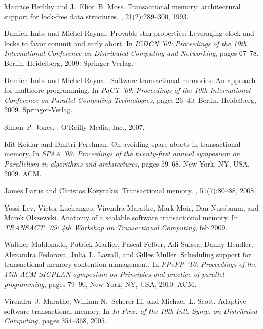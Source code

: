 \begin{thebibliography}{99}
{
Maurice Herlihy and J.~Eliot~B. Moss.
\newblock Transactional memory: architectural support for lock-free data
  structures.
, 21(2):289--300, 1993.

Damien Imbs and Michel Raynal.
\newblock Provable stm properties: Leveraging clock and locks to favor commit
  and early abort.
\newblock In {\em ICDCN '09: Proceedings of the 10th International Conference
  on Distributed Computing and Networking}, pages 67--78, Berlin, Heidelberg,
  2009. Springer-Verlag.

Damien Imbs and Michel Raynal.
\newblock Software transactional memories: An approach for multicore
  programming.
\newblock In {\em PaCT '09: Proceedings of the 10th International Conference on
  Parallel Computing Technologies}, pages 26--40, Berlin, Heidelberg, 2009.
  Springer-Verlag.

Simon~P. Jones.
.
\newblock O'Reilly Media, Inc., 2007.

Idit Keidar and Dmitri Perelman.
\newblock On avoiding spare aborts in transactional memory.
\newblock In {\em SPAA '09: Proceedings of the twenty-first annual symposium on
  Parallelism in algorithms and architectures}, pages 59--68, New York, NY,
  USA, 2009. ACM.

James Larus and Christos Kozyrakis.
\newblock Transactional memory.
, 51(7):80--88, 2008.

Yossi Lev, Victor Luchangco, Virendra Marathe, Mark Moir, Dan Nussbaum, and
  Marek Olszewski.
\newblock Anatomy of a scalable software transactional memory.
\newblock In {\em TRANSACT~'09: 4th Workshop on Transactional Computing}, feb
  2009.

Walther Maldonado, Patrick Marlier, Pascal Felber, Adi Suissa, Danny Hendler,
  Alexandra Fedorova, Julia~L. Lawall, and Gilles Muller.
\newblock Scheduling support for transactional memory contention management.
\newblock In {\em PPoPP '10: Proceedings of the 15th ACM SIGPLAN symposium on
  Principles and practice of parallel programming}, pages 79--90, New York, NY,
  USA, 2010. ACM.

Virendra~J. Marathe, William N.~Scherer Iii, and Michael~L. Scott.
\newblock Adaptive software transactional memory.
\newblock In {\em In Proc. of the 19th Intl. Symp. on Distributed Computing},
  pages 354--368, 2005.

}
\end{thebibliography}
